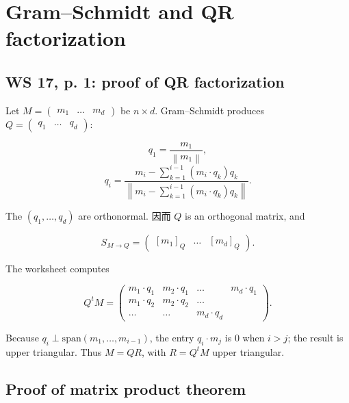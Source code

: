 \chapter{Gram--Schmidt and QR factorization}

\section{\texorpdfstring{WS 17, p. 1: proof of QR factorization }{WS 17, p. 1: proof of QR factorization }}

Let \(M = \begin{pmatrix}
m_{1} & \ldots & m_{d}
\end{pmatrix}\) be \(n \times d\). Gram--Schmidt produces \(Q = \begin{pmatrix}
q_{1} & \ldots & q_{d}
\end{pmatrix}\):

\[q_{1} = \frac{m_{1}}{\left\| m_{1} \right\|},\]\[q_{i} = \frac{m_{i} - \sum_{k = 1}^{i - 1}\left( {m_{i} \cdot q_{k}} \right)q_{k}}{\left\| {m_{i} - \sum_{k = 1}^{i - 1}\left( {m_{i} \cdot q_{k}} \right)q_{k}} \right\|}.\]

The \(\left( {q_{1},\ldots,q_{d}} \right)\) are orthonormal. 因而 \(Q\) is an orthogonal matrix, and

\[S_{M\rightarrow Q} = \begin{pmatrix}
\left\lbrack m_{1} \right\rbrack_{Q} & \ldots & \left\lbrack m_{d} \right\rbrack_{Q}
\end{pmatrix}.\]

The worksheet computes

\[Q^{t}M = \begin{pmatrix}
{m_{1} \cdot q_{1}} & {m_{2} \cdot q_{1}} & \ldots & {m_{d} \cdot q_{1}} \\
{m_{1} \cdot q_{2}} & {m_{2} \cdot q_{2}} & \ldots & \\
\ldots & \ldots & {m_{d} \cdot q_{d}} &
\end{pmatrix}.\]

Because \(q_{i} \perp \text{span}\left( {m_{1},\ldots,m_{i - 1}} \right)\), the entry \(q_{i} \cdot m_{j}\) is \(0\) when \(i > j\); the result is upper triangular. Thus \(M = QR\), with \(R = Q^{t}M\) upper triangular.

\section{Proof of matrix product theorem}

